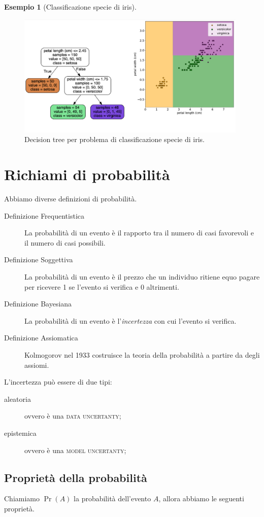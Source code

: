 \documentclass[10pt]{article}
\DeclareMathOperator{\pr}{Pr}
\newcommand{\im}[1]{\textsc{#1}}
\theoremstyle{definition}
\newtheorem{example}{Esempio}[section]
\begin{document}
\begin{example}[Classificazione specie di iris]
\begin{figure}
\includegraphics[width=0.98\textwidth]{Images/iris_decision_tree.PNG}
\caption{Decision tree per problema di classificazione specie di iris.}\label{fig:iris-decision-tree}
\end{figure}

\end{example}

\section{Richiami di probabilità}
Abbiamo diverse definizioni di probabilità.
\begin{description}
\item[Definizione Frequentistica] La probabilità di un evento è il rapporto tra il numero di casi favorevoli e il numero di casi possibili.
\item[Definizione Soggettiva] La probabilità di un evento è il prezzo che un individuo ritiene equo pagare per ricevere 1 se l'evento si verifica e 0 altrimenti.
\item[Definizione Bayesiana] La probabilità di un evento è l'\textit{incertezza} con cui l'evento si verifica.
\item[Definizione Assiomatica] Kolmogorov nel 1933 costruisce la teoria della probabilità a partire da degli assiomi.
\end{description}

L'incertezza può essere di due tipi:
\begin{description}
\item[aleatoria] ovvero è una \im{data uncertanty};
\item[epistemica] ovvero è una \im{model uncertanty};
\end{description}

\subsection{Proprietà della probabilità}
Chiamiamo $\pr(A)$ la probabilità dell'evento $A$, allora abbiamo le seguenti proprietà.
\end{document}
